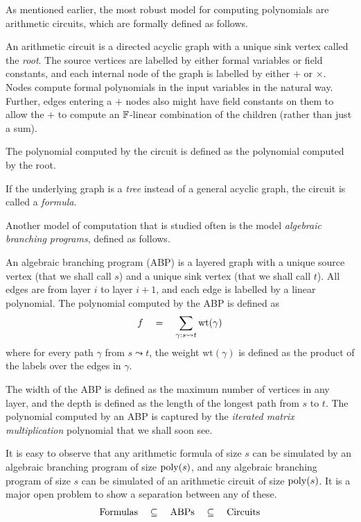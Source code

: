 As mentioned earlier, the most robust model for computing polynomials are arithmetic circuits, which are formally defined as follows. 

\begin{definition}\label{defn:arithmetic-circuit}
An arithmetic circuit is a directed acyclic graph with a unique sink vertex called the \emph{root}. 
The source vertices are labelled by either formal variables or field constants, and each internal node of the graph is labelled by either $+$ or $\times$. 
Nodes compute formal polynomials in the input variables  in the natural way. 
Further, edges entering a $+$ nodes also might have field constants on them to allow the $+$ to compute an $\mathbb{F}$-linear combination of the children (rather than just a sum). 

The polynomial computed by the circuit is defined as the polynomial computed by the root.

\noindent
If the underlying graph is a \emph{tree} instead of a general acyclic graph, the circuit is called a \emph{formula}.
\end{definition}


Another model of computation that is studied often is the model \emph{algebraic branching programs}, defined as follows. 

\begin{definition}\label{defn:ABP}
An algebraic branching program (ABP) is a layered graph with a unique source vertex (that we shall call $s$) and a unique sink vertex (that we shall call $t$). 
All edges are from layer $i$ to layer $i+1$, and each edge is labelled by a linear polynomial. 
The polynomial computed by the ABP is defined as 
\[
f\quad = \quad \sum_{\gamma: s \leadsto t} \mathrm{wt}(\gamma)
\]
where for every path $\gamma$ from $s\leadsto t$, the weight $\mathrm{wt}(\gamma)$ is defined as the product of the labels over the edges in $\gamma$. 
\end{definition}

The width of the ABP is defined as the maximum number of vertices in any layer, and the depth is defined as the length of the longest path from $s$ to $t$. 
The polynomial computed by an ABP is captured by the \emph{iterated matrix multiplication} polynomial that we shall soon see. 

It is easy to observe that any arithmetic formula of size $s$ can be simulated by an algebraic branching program of size $\operatorname{poly}(s)$, and any algebraic branching program of size $s$ can be simulated of an arithmetic circuit of size $\operatorname{poly}(s)$. 
It is a major open problem to show a separation between any of these.   
\[
    \mathrm{Formulas} \quad \subseteq \quad \mathrm{ABPs} \quad \subseteq \quad \mathrm{Circuits}
\]

